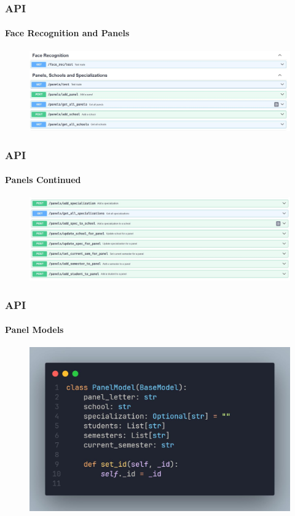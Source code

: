 \documentclass[aspectratio=169]{beamer}
\begin{document}
\begin{frame}
	\centering
	\frametitle{API}
	\framesubtitle{Face Recognition and Panels}
	\begin{minipage}{0.95\textwidth}
		\begin{figure}[H]
			\centering
			\includegraphics[width=.95\textwidth]{swagger 3.jpg}
		\end{figure}
	\end{minipage}
\end{frame}
\begin{frame}
	\centering
	\frametitle{API}
	\framesubtitle{Panels Continued}
	\begin{minipage}{0.95\textwidth}
		\begin{figure}[H]
			\centering
			\includegraphics[width=.95\textwidth]{swagger 4.jpg}
		\end{figure}
	\end{minipage}
\end{frame}
\begin{frame}
	\centering
	\frametitle{API}
	\framesubtitle{Panel Models}
	\begin{minipage}{0.95\textwidth}
		\begin{figure}[H]
			\centering
			\includegraphics[width=.95\textwidth]{panel.jpg}
		\end{figure}
	\end{minipage}
\end{frame}
\end{document}
